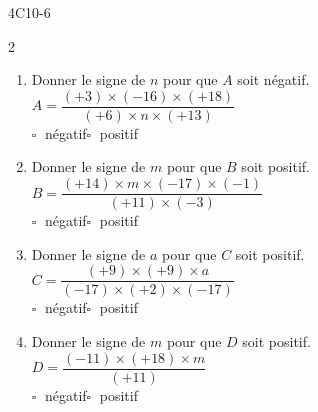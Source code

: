 \begin{EXO}{}{4C10-6}
\begin{multicols}{2}
\begin{enumerate}[itemsep=2em]
	\item \begin{minipage}[t]{\linewidth} Donner le signe de $n$ pour que $A$ soit négatif. \\$ A =  \dfrac {(+3)\times (-16)\times (+18)}{(+6)\times n\times (+13)} $ \\ 
    
    	$\square\;$ négatif\qquad $\square\;$ positif\qquad \\
 \end{minipage}
	\item \begin{minipage}[t]{\linewidth} Donner le signe de $m$ pour que $B$ soit positif. \\$ B =  \dfrac {(+14)\times m\times (-17)\times (-1)}{(+11)\times (-3)} $ \\ 
    
    	$\square\;$ négatif\qquad $\square\;$ positif\qquad \\
 \end{minipage}
	\item \begin{minipage}[t]{\linewidth} Donner le signe de $a$ pour que $C$ soit positif. \\$ C =  \dfrac {(+9)\times (+9)\times a}{(-17)\times (+2)\times (-17)} $ \\ 
    
    	$\square\;$ négatif\qquad $\square\;$ positif\qquad \\
 \end{minipage}
	\item \begin{minipage}[t]{\linewidth} Donner le signe de $m$ pour que $D$ soit positif. \\$ D =  \dfrac {(-11)\times (+18)\times m}{(+11)} $ \\ 
    
    	$\square\;$ négatif\qquad $\square\;$ positif\qquad \\
 \end{minipage}
\end{enumerate}
\end{multicols}
\end{EXO}

